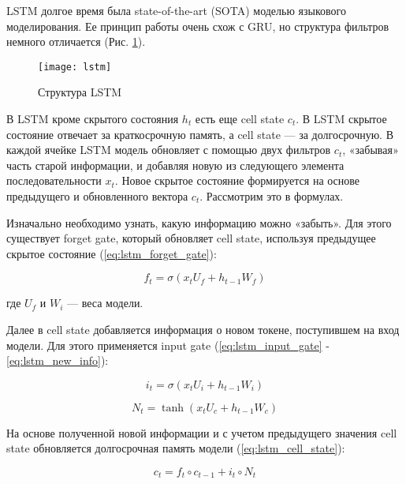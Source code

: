 LSTM долгое время была state-of-the-art (SOTA) моделью языкового моделирования. Ее принцип работы очень схож с GRU, но структура фильтров немного отличается (Рис. \ref{fig:lstm}).

\begin{figure}[ht]
	\centering
	\texttt{[image: lstm]}  
	\caption{ Структура LSTM \cite{lstm_pic} }
	\label{fig:lstm}
\end{figure}

В LSTM кроме скрытого состояния $h_t$ есть еще cell state $c_t$. В LSTM скрытое состояние отвечает за краткосрочную память, а cell state --- за долгосрочную. В каждой ячейке LSTM модель обновляет с помощью двух фильтров $c_t$, «забывая» часть старой информации, и добавляя новую из следующего элемента последовательности $x_t$. Новое скрытое состояние формируется на основе предыдущего и обновленного вектора $c_t$. Рассмотрим это в формулах.

Изначально необходимо узнать, какую информацию можно «забыть». Для этого существует forget gate, который обновляет cell state, используя предыдущее скрытое состояние (\ref{eq:lstm_forget_gate}):

\begin{equation}
	f_t = \sigma(x_tU_f + h_{t-1}W_f)
	\label{eq:lstm_forget_gate}
\end{equation}
\begin{explanation}
	где $U_f$ и $W_i$ --- веса модели.
\end{explanation}

Далее в cell state добавляется информация о новом токене, поступившем на вход модели. Для этого применяется input gate (\ref{eq:lstm_input_gate} - \ref{eq:lstm_new_info}):

\begin{equation}
	i_t = \sigma(x_tU_i + h_{t-1}W_i)
	\label{eq:lstm_input_gate}
\end{equation}

\begin{equation}
	N_t = \tanh{(x_tU_c + h_{t-1}W_c)}
	\label{eq:lstm_new_info}
\end{equation}

На основе полученной новой информации и с учетом предыдущего значения cell state обновляется долгосрочная память модели (\ref{eq:lstm_cell_state}):

\begin{equation}
	c_t = f_t\circ c_{t-1} + i_t\circ N_t
	\label{eq:lstm_cell_state}
\end{equation}

